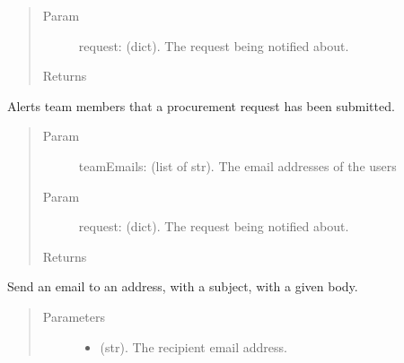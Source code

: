\documentclass[letterpaper,10pt,english]{sphinxmanual}
\begin{document}
\begin{fulllineitems}
\begin{fulllineitems}
\begin{quote}
\begin{description}
\item[{Param}] \leavevmode
request: (dict). The request being notified about.

\item[{Returns}] \leavevmode


\end{description}\end{quote}

\end{fulllineitems}


\begin{fulllineitems}
\label{\detokenize{apidoc/utdesign_procurement:utdesign_procurement.emailer.EmailHandler.procurementSave}}
Alerts team members that a procurement request has been submitted.
\begin{quote}\begin{description}
\item[{Param}] \leavevmode
teamEmails: (list of str). The email addresses of the users

\item[{Param}] \leavevmode
request: (dict). The request being notified about.

\item[{Returns}] \leavevmode


\end{description}\end{quote}

\end{fulllineitems}


\begin{fulllineitems}
\label{\detokenize{apidoc/utdesign_procurement:utdesign_procurement.emailer.EmailHandler.send}}
Send an email to an address, with a subject, with a given body.
\begin{quote}\begin{description}
\item[{Parameters}] \leavevmode\begin{itemize}
\item {} 
 \textendash{} (str). The recipient email address.


\end{itemize}
\end{description}
\end{quote}
\end{fulllineitems}
\end{fulllineitems}
\end{document}
